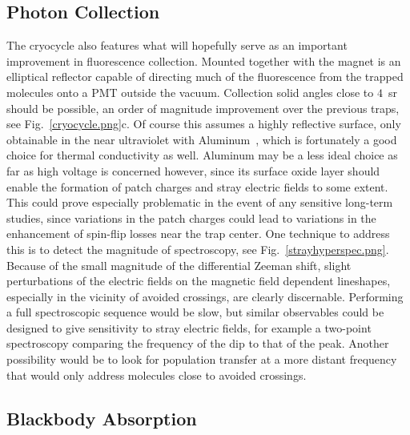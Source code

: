 \subsection{Photon Collection}

The cryocycle also features what will hopefully serve as an important improvement in fluorescence collection.
Mounted together with the magnet is an elliptical reflector capable of directing much of the fluorescence from the trapped molecules onto a PMT outside the vacuum.
Collection solid angles close to $4$~sr should be possible, an order of magnitude improvement over the previous traps, see Fig.~\ref{cryocycle.png}c.
Of course this assumes a highly reflective surface, only obtainable in the near ultraviolet with Aluminum~\cite{rumble2017crc}, which is fortunately a good choice for thermal conductivity as well.
Aluminum may be a less ideal choice as far as high voltage is concerned however, since its surface oxide layer should enable the formation of patch charges and stray electric fields to some extent.
This could prove especially problematic in the event of any sensitive long-term studies, since variations in the patch charges could lead to variations in the enhancement of spin-flip losses near the trap center.
One technique to address this is to detect the magnitude of spectroscopy, see Fig.~\ref{strayhyperspec.png}.
Because of the small magnitude of the differential Zeeman shift, slight perturbations of the electric fields on the magnetic field dependent lineshapes, especially in the vicinity of avoided crossings, are clearly discernable.
Performing a full spectroscopic sequence would be slow, but similar observables could be designed to give sensitivity to stray electric fields, for example a two-point spectroscopy comparing the frequency of the dip to that of the peak.
Another possibility would be to look for population transfer at a more distant frequency that would only address molecules close to avoided crossings.


\subsection{Blackbody Absorption}

